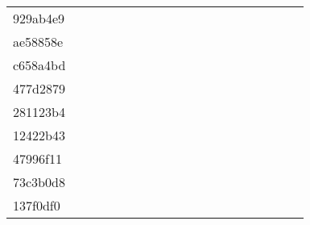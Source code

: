 \begin{table*}[htb]
\begin{tabular}{l|cccccccccccccccccc}
929ab4e9  & \C & \X & \X & \X & \X & \X & \X & \X & \X & \X & \X & \X & \X & \X & \C & \X & \X \\
ae58858e  & \C & \X & \X & \X & \X & \X & \X & \X & \X & \X & \C & \C & \C & \C & \C & \C & \C \\
c658a4bd  & \C & \X & \X & \X & \X & \X & \X & \X & \X & \X & \X & \C & \X & \C & \C & \C & \X \\
477d2879  & \C & \X & \X & \X & \X & \X & \X & \X & \X & \X & \X & \X & \X & \X & \C & \X & \X \\
281123b4  & \C & \X & \X & \X & \X & \X & \X & \X & \X & \X & \X & \X & \X & \C & \C & \C & \C \\
12422b43  & \C & \X & \X & \C & \X & \C & \X & \X & \X & \X & \X & \C & \C & \C & \C & \C & \C \\
47996f11  & \C & \X & \X & \X & \X & \X & \X & \X & \X & \X & \X & \X & \X & \X & \X & \X & \X \\
73c3b0d8  & \C & \X & \X & \X & \X & \X & \X & \X & \X & \X & \X & \X & \X & \C & \C & \X & \X \\
137f0df0  & \C & \X & \X & \X & \X & \X & \X & \X & \X & \X & \X & \X & \C & \C & \C & \C & \C \\
\bottomrule
\end{tabular}
\label{tab:arc400eval1}
\end{table*}

\newpage
\clearpage

